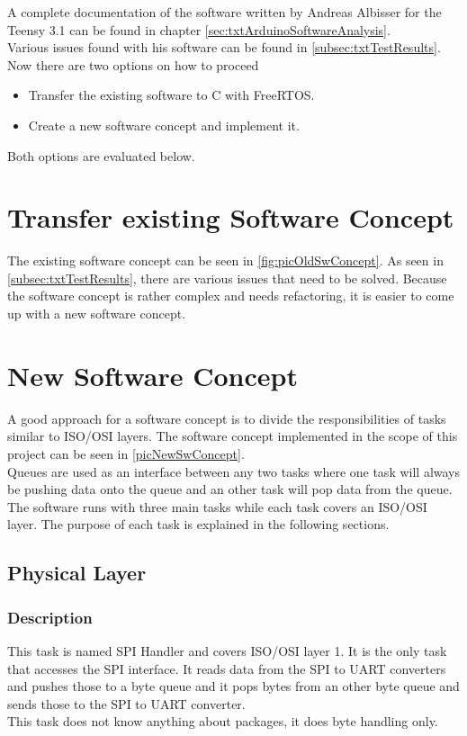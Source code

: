 %
A complete documentation of the software written by Andreas Albisser for the Teensy 3.1 can be found in chapter \autoref{sec:txtArduinoSoftwareAnalysis}.\\
Various issues found with his software can be found in \autoref{subsec:txtTestResults}.\\
Now there are two options on how to proceed
\begin{itemize}
    \item Transfer the existing software to C with FreeRTOS.
    \item Create a new software concept and implement it.
\end{itemize}
Both options are evaluated below.
%
%
\section{Transfer existing Software Concept}
The existing software concept can be seen in \autoref{fig:picOldSwConcept}. As seen in \autoref{subsec:txtTestResults}, there are various issues that need to be solved. Because the software concept is rather complex and needs refactoring, it is easier to come up with a new software concept.
%
\section{New Software Concept}%
%
%
A good approach for a software concept is to divide the responsibilities of tasks similar to ISO/OSI layers. 
The software concept implemented in the scope of this project can be seen in \autoref{picNewSwConcept}.\\
Queues are used as an interface between any two tasks where one task will always be pushing data onto the queue and an other task will pop data from the queue.\\
The software runs with three main tasks while each task covers an ISO/OSI layer. The purpose of each task is explained in the following sections.
%
%
\subsection{Physical Layer}
\subsubsection{Description}
This task is named SPI Handler and covers ISO/OSI layer 1. It is the only task that accesses the SPI interface. It reads data from the SPI to UART converters and pushes those to a byte queue and it pops bytes from an other byte queue and sends those to the SPI to UART converter.\\
This task does not know anything about packages, it does byte handling only.
